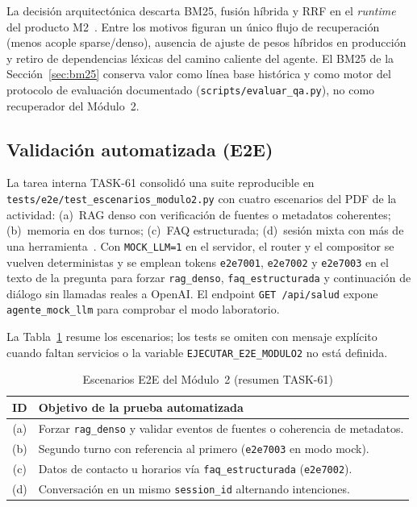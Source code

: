 \documentclass[conference]{IEEEtran}
\newcommand{\code}[1]{\texttt{\small #1}}
\begin{document}
La decisión arquitectónica descarta BM25, fusión híbrida y RRF en el
\textit{runtime} del producto M2~\cite{decision3m2}. Entre los motivos
figuran un único flujo de recuperación (menos acople sparse/denso),
ausencia de ajuste de pesos híbridos en producción y retiro de dependencias
léxicas del camino caliente del agente. El BM25 de la Sección~\ref{sec:bm25}
conserva valor como línea base histórica y como motor del protocolo de
evaluación documentado (\code{scripts/evaluar\_qa.py}), no como recuperador
del Módulo~2.

\subsection{Validación automatizada (E2E)}

La tarea interna TASK-61 consolidó una suite reproducible en
\code{tests/e2e/test\_escenarios\_modulo2.py} con cuatro escenarios del PDF
de la actividad: (a)~RAG denso con verificación de fuentes o metadatos
coherentes; (b)~memoria en dos turnos; (c)~FAQ estructurada; (d)~sesión mixta
con más de una herramienta~\cite{e2em2tests}. Con \code{MOCK\_LLM=1} en el
servidor, el router y el compositor se vuelven deterministas y se emplean
tokens \code{e2e7001}, \code{e2e7002} y \code{e2e7003} en el texto de la
pregunta para forzar \code{rag\_denso}, \code{faq\_estructurada} y
continuación de diálogo sin llamadas reales a OpenAI. El endpoint
\code{GET /api/salud} expone \code{agente\_mock\_llm} para comprobar el modo
laboratorio.

La Tabla~\ref{tab:e2e_m2} resume los escenarios; los tests se omiten con
mensaje explícito cuando faltan servicios o la variable
\code{EJECUTAR\_E2E\_MODULO2} no está definida.

\begin{table}[ht]
\centering
\caption{Escenarios E2E del Módulo~2 (resumen TASK-61)}
\label{tab:e2e_m2}
\setlength{\tabcolsep}{3pt}
\begin{tabular}{@{}cp{}@{}}
\toprule
\textbf{ID} & \textbf{Objetivo de la prueba automatizada} \\
\midrule
(a) & Forzar \code{rag\_denso} y validar eventos de fuentes o coherencia de metadatos. \\
(b) & Segundo turno con referencia al primero (\code{e2e7003} en modo mock). \\
(c) & Datos de contacto u horarios vía \code{faq\_estructurada} (\code{e2e7002}). \\
(d) & Conversación en un mismo \code{session\_id} alternando intenciones. \\
\bottomrule
\end{tabular}
\end{table}
\end{document}
